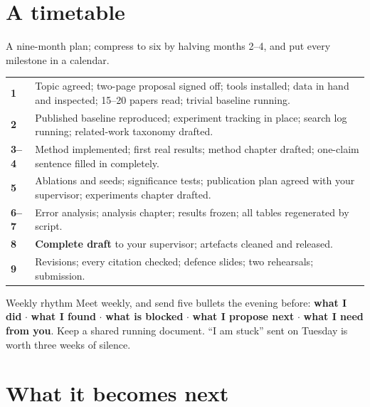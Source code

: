 \documentclass[11pt,a4paper]{article}
\begin{document}
\section{A timetable}

A nine-month plan; compress to six by halving months 2--4, and put every
milestone in a calendar.

\begin{center}
\small
\begin{tabularx}{\textwidth}{L{2.0cm} X}
\toprule
{} &  \\
\midrule
{}
\textbf{1} & Topic agreed; two-page proposal signed off; tools installed; data
in hand and inspected; 15--20 papers read; trivial baseline running. \\
\textbf{2} & Published baseline reproduced; experiment tracking in place;
search log running; related-work taxonomy drafted. \\
\textbf{3--4} & Method implemented; first real results; method chapter
drafted; one-claim sentence filled in completely. \\
\textbf{5} & Ablations and seeds; significance tests; publication plan agreed
with your supervisor; experiments chapter drafted. \\
\textbf{6--7} & Error analysis; analysis chapter; results frozen; all tables
regenerated by script. \\
\textbf{8} & \textbf{Complete draft} to your supervisor; artefacts cleaned and
released. \\
\textbf{9} & Revisions; every citation checked; defence slides; two
rehearsals; submission. \\
\bottomrule
\end{tabularx}
\end{center}

\begin{cbox}{Weekly rhythm}
Meet weekly, and send five bullets the evening before: \textbf{what I did}
$\cdot$ \textbf{what I found} $\cdot$ \textbf{what is blocked} $\cdot$
\textbf{what I propose next} $\cdot$ \textbf{what I need from you}. Keep a
shared running document. ``I am stuck'' sent on Tuesday is worth three weeks
of silence.
\end{cbox}

\section{What it becomes next}
\end{document}

